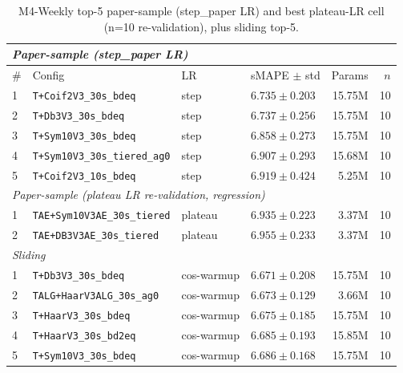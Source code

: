 \documentclass{article}
\begin{document}
\begin{table}[h]
\centering
\scriptsize
\setlength{\tabcolsep}{2.5pt}
\caption{M4-Weekly top-5 paper-sample (step\_paper LR) and best plateau-LR cell (n=10 re-validation), plus sliding top-5.}
\label{tab:m4_weekly_full}
\begin{tabular}{@{}llllrr@{}}
\toprule
\multicolumn{6}{l}{\textit{Paper-sample (step\_paper LR)}} \\
\midrule
\# & Config & LR & sMAPE $\pm$ std & Params & $n$ \\
\midrule
1 & \texttt{T+Coif2V3\_30s\_bdeq}           & step    & $\mathbf{6.735 \pm 0.203}$ & 15.75M & 10 \\
2 & \texttt{T+Db3V3\_30s\_bdeq}             & step    & $6.737 \pm 0.256$          & 15.75M & 10 \\
3 & \texttt{T+Sym10V3\_30s\_bdeq}           & step    & $6.858 \pm 0.273$          & 15.75M & 10 \\
4 & \texttt{T+Sym10V3\_30s\_tiered\_ag0}    & step    & $6.907 \pm 0.293$          & 15.68M & 10 \\
5 & \texttt{T+Coif2V3\_10s\_bdeq}           & step    & $6.919 \pm 0.424$          & 5.25M  & 10 \\
\midrule
\multicolumn{6}{l}{\textit{Paper-sample (plateau LR re-validation, regression)}} \\
\midrule
1 & \texttt{TAE+Sym10V3AE\_30s\_tiered}     & plateau & $6.935 \pm 0.223$          & 3.37M  & 10 \\
2 & \texttt{TAE+DB3V3AE\_30s\_tiered}       & plateau & $6.955 \pm 0.233$          & 3.37M  & 10 \\
\midrule
\multicolumn{6}{l}{\textit{Sliding}} \\
\midrule
1 & \texttt{T+Db3V3\_30s\_bdeq}             & cos-warmup & $\mathbf{6.671 \pm 0.208}$ & 15.75M & 10 \\
2 & \texttt{TALG+HaarV3ALG\_30s\_ag0}       & cos-warmup & $6.673 \pm 0.129$          & 3.66M  & 10 \\
3 & \texttt{T+HaarV3\_30s\_bdeq}            & cos-warmup & $6.675 \pm 0.185$          & 15.75M & 10 \\
4 & \texttt{T+HaarV3\_30s\_bd2eq}           & cos-warmup & $6.685 \pm 0.193$          & 15.85M & 10 \\
5 & \texttt{T+Sym10V3\_30s\_bdeq}           & cos-warmup & $6.686 \pm 0.168$          & 15.75M & 10 \\
\bottomrule
\end{tabular}
\end{table}
\end{document}
